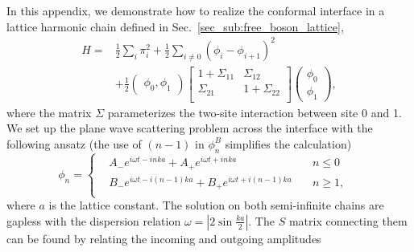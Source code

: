 
In this appendix, we demonstrate how to realize the conformal interface in a lattice harmonic chain defined in Sec.~\ref{sec_sub:free_boson_lattice},
\begin{equation}
\begin{aligned}
H =& \frac{1}{2} \sum_i \pi_i^2  +  \frac{1}{2} \sum_{i\ne 0 }  ( \phi_i - \phi_{i+1} )^2  \\
 &+ \frac{1}{2} \begin{pmatrix}  \phi_0, \phi_1 \end{pmatrix}
\begin{bmatrix}
1 + \Sigma_{11}  & \Sigma_{12} \\
\Sigma_{21} &  1 + \Sigma_{22} \\
\end{bmatrix}
\begin{pmatrix}
  \phi_0 \\
  \phi_1 
\end{pmatrix},
\end{aligned}
\end{equation}
where the matrix $\Sigma$ parameterizes the two-site interaction between site 0 and 1. We set up the plane wave scattering problem across the interface with the following ansatz (the use of $(n-1)$ in $\phi_n^B$ simplifies the calculation)
\begin{equation}
\label{eq:ansatz}
\phi_n
= \left\lbrace
  \begin{aligned}
	& A_{-} e^{i \omega t  - inka}  + A_{+} e^{i \omega t  + inka}  & \quad  n \le 0 \\
	& B_{-} e^{i \omega t  - i(n-1)ka}  + B_{+} e^{i \omega t  + i(n-1)ka} & \quad n \ge 1 ,\\
  \end{aligned} \right. 
 \quad 
\end{equation}
where $a$ is the lattice constant. The solution on both semi-infinite chains are gapless with the dispersion relation $\omega = \left|2\sin\frac{ka}{2}\right|$. The $S$ matrix connecting them can be found by relating the incoming and outgoing amplitudes

